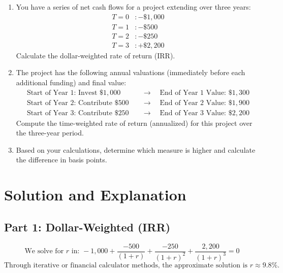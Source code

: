 \begin{enumerate}
\item You have a series of net cash flows for a project extending over three years:  
\[
\begin{aligned}
T=0 &: -\$1{,}000\\
T=1 &: -\$500\\
T=2 &: -\$250\\
T=3 &: +\$2{,}200
\end{aligned}
\]
Calculate the dollar-weighted rate of return (IRR).
\item The project has the following annual valuations (immediately before each additional funding) and final value:
\[
\begin{aligned}
\text{Start of Year 1: Invest } \$1{,}000 \quad &\rightarrow \quad \text{End of Year 1 Value: } \$1{,}300\\
\text{Start of Year 2: Contribute } \$500 \quad &\rightarrow \quad \text{End of Year 2 Value: } \$1{,}900\\
\text{Start of Year 3: Contribute } \$250 \quad &\rightarrow \quad \text{End of Year 3 Value: } \$2{,}200
\end{aligned}
\]
Compute the time-weighted rate of return (annualized) for this project over the three-year period.
\item Based on your calculations, determine which measure is higher and calculate the difference in basis points.
\end{enumerate}

\section*{Solution and Explanation}
\subsection*{Part 1: Dollar-Weighted (IRR)}
\[
\text{We solve for } r \text{ in: }
-1{,}000 + \frac{-500}{(1+r)} + \frac{-250}{(1+r)^2} + \frac{2{,}200}{(1+r)^3} = 0
\]
\[
\text{Through iterative or financial calculator methods, the approximate solution is } r \approx 9.8\%.
\]

